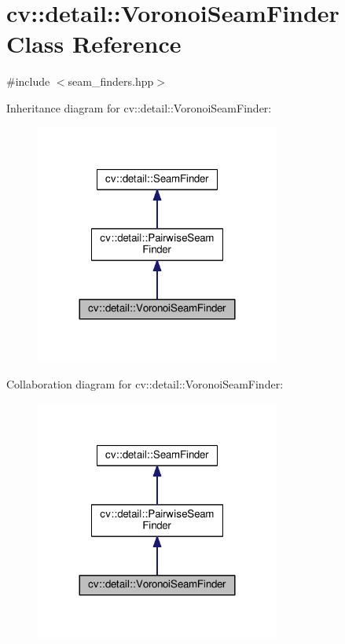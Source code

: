 \hypertarget{classcv_1_1detail_1_1VoronoiSeamFinder}{\section{cv\-:\-:detail\-:\-:Voronoi\-Seam\-Finder Class Reference}
\label{classcv_1_1detail_1_1VoronoiSeamFinder}
}


{\ttfamily \#include $<$seam\-\_\-finders.\-hpp$>$}



Inheritance diagram for cv\-:\-:detail\-:\-:Voronoi\-Seam\-Finder\-:\nopagebreak
\begin{figure}[H]
\begin{center}
\leavevmode
\includegraphics[width=228pt]{classcv_1_1detail_1_1VoronoiSeamFinder__inherit__graph}
\end{center}
\end{figure}


Collaboration diagram for cv\-:\-:detail\-:\-:Voronoi\-Seam\-Finder\-:\nopagebreak
\begin{figure}[H]
\begin{center}
\leavevmode
\includegraphics[width=228pt]{classcv_1_1detail_1_1VoronoiSeamFinder__coll__graph}
\end{center}
\end{figure}
